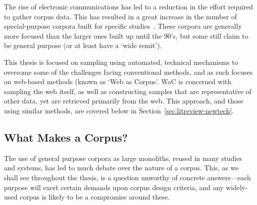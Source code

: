 % 


The rise of electronic communications has led to a reduction in the effort required to gather corpus data.  This has resulted in a great increase in the number of special-purpose corpora built for specific studies~\cite{westlabusenet2013,ferraresi2008introducing}.  These corpora are generally more focused than the larger ones built up until the 90's, but some still claim to be general purpose (or at least have a `wide remit').  


This thesis is focused on sampling using automated, technical mechanisms to oversome some of the challenges facing conventional methods, and as such focuses on web-based methods (known as `Web as Corpus'.  WaC is concerned with sampling the web itself, as well as constructing samples that are representative of other data, yet are retrieved primarily from the web.  This approach, and those using similar methods, are covered below in Section~\ref{sec:litreview-newtech}.






















\subsection{What Makes a Corpus?}
The use of general purpose corpora as large monoliths, reused in many studies and systems, has led to much debate over the nature of a corpus.  This, as we shall see throughout the thesis, is a question unworthy of concrete answers---each purpose will exert certain demands upon corpus design criteria, and any widely-used corpus is likely to be a compromise around these.

